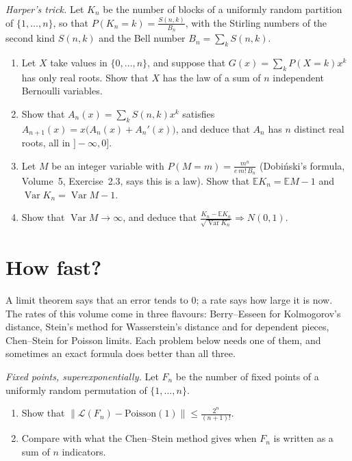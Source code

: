 \begin{exercise}[$\star\star\star$]\label{pb:harper}
\emph{Harper's trick.} Let $K_n$ be the number of blocks of a uniformly random partition of $\{1,\dots,n\}$, so that $P(K_n=k)=\frac{S(n,k)}{B_n}$, with the
Stirling numbers of the second kind $S(n,k)$ and the Bell number $B_n=\sum_kS(n,k)$.
\begin{enumerate}[label=(\alph*)]
\item Let $X$ take values in $\{0,\dots,n\}$, and suppose that $G(x)=\sum_kP(X=k)x^k$ has only real roots. Show that $X$ has the law of a sum of
$n$ independent Bernoulli variables.
\item Show that $A_n(x)=\sum_kS(n,k)x^k$ satisfies $A_{n+1}(x)=x\bigl(A_n(x)+A_n'(x)\bigr)$, and deduce that $A_n$ has $n$ distinct real roots, all in $]-\infty,0]$.
\item Let $M$ be an integer variable with $P(M=m)=\frac{m^n}{e\,m!\,B_n}$ (Dobi\'nski's formula, Volume~5, Exercise~2.3, says this is a law). Show that
$\mathbb EK_n=\mathbb EM-1$ and $\operatorname{Var}K_n=\operatorname{Var}M-1$.
\item Show that $\operatorname{Var}M\to\infty$, and deduce that $\frac{K_n-\mathbb EK_n}{\sqrt{\operatorname{Var}K_n}}\Rightarrow N(0,1)$.
\end{enumerate}
\end{exercise}

\section{How fast?}

A limit theorem says that an error tends to $0$; a rate says how large it is now. The rates of this volume come in three flavours: Berry--Esseen for
Kolmogorov's distance, Stein's method for Wasserstein's distance and for dependent pieces, Chen--Stein for Poisson limits. Each problem below needs one
of them, and sometimes an exact formula does better than all three.

\begin{exercise}[$\star$]\label{pb:fixedtv}
\emph{Fixed points, superexponentially.} Let $F_n$ be the number of fixed points of a uniformly random permutation of $\{1,\dots,n\}$.
\begin{enumerate}[label=(\alph*)]
\item Show that $\bigl\|\mathcal L(F_n)-\text{Poisson}(1)\bigr\|\le\frac{2^n}{(n+1)!}$.
\item Compare with what the Chen--Stein method gives when $F_n$ is written as a sum of $n$ indicators.
\end{enumerate}
\end{exercise}


